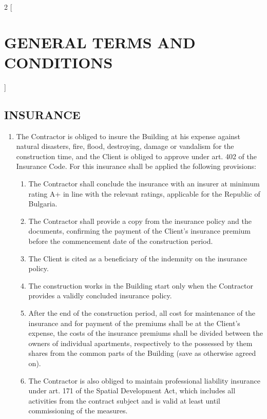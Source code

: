 \begin{multicols}{2} [\section{GENERAL TERMS AND CONDITIONS}]
      \subsection{INSURANCE}
      \begin{enumerate}
      \item The Contractor is obliged to insure the Building at his
        expense against natural disasters, fire, flood, destroying,
        damage or vandalism for the construction time, and the Client
        is obliged to approve under art. 402 of the Insurance
        Code. For this insurance shall be applied the following
        provisions:
        \begin{enumerate}
        \item The Contractor shall conclude the insurance with an
          insurer at minimum rating A+ in line with the relevant
          ratings, applicable for the Republic of Bulgaria.
        \item The Contractor shall provide a copy from the insurance
          policy and the documents, confirming the payment of the
          Client’s insurance premium before the commencement date of
          the construction period.
        \item The Client is cited as a beneficiary of the indemnity on
          the insurance policy.
        \item The construction works in the Building start only when
          the Contractor provides a validly concluded insurance
          policy.
        \item After the end of the construction period, all cost for
          maintenance of the insurance and for payment of the premiums
          shall be at the Client’s expense, the costs of the insurance
          premiums shall be divided between the owners of individual
          apartments, respectively to the possessed by them shares
          from the common parts of the Building (save as otherwise
          agreed on).
        \item The Contractor is also obliged to maintain professional
          liability insurance under art. 171 of the Spatial
          Development Act, which includes all activities from the
          contract subject and is valid at least until commissioning
          of the measures.
        \end{enumerate}
      \end{enumerate}


\end{multicols}
